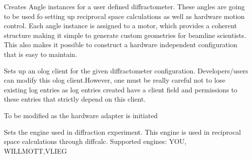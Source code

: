 \documentclass[letterpaper,10pt,english]{sphinxmanual}
\begin{document}
\begin{fulllineitems}
\begin{fulllineitems}
\end{fulllineitems}


\begin{fulllineitems}
\label{Manual:Diffractometer.Diffractometer.setAnglesforHardware}
Creates Angle instances for a user defined diffractometer. These angles are going to be used fo setting up 
reciprocal space calculations as well as hardware motion control. 
Each angle instance is assigned to a motor, which provides a coherent structure making it simple to generate 
custom geometries for beamline scientists. This also makes it possible to construct a hardware independent
configuration that is easy to maintain.

\end{fulllineitems}


\begin{fulllineitems}
\label{Manual:Diffractometer.Diffractometer.setClient}
Sets up an olog client for the given diffractometer configuration. Developers/users can modify this olog client.However, one must be really careful not to lose existing log entries as log entries created have a client field and permissions to these entries that strictly depend on this client.

\end{fulllineitems}


\begin{fulllineitems}
\label{Manual:Diffractometer.Diffractometer.setDCInstance}
To be modified as the hardware adapter is initiated

\end{fulllineitems}


\begin{fulllineitems}
\label{Manual:Diffractometer.Diffractometer.setEngine}
Sets the engine used in diffraction experiment. This engine is used in reciprocal space
calculations through diffcalc. 
Supported engines: YOU, WILLMOTT,VLIEG


\end{fulllineitems}
\end{fulllineitems}
\end{document}
